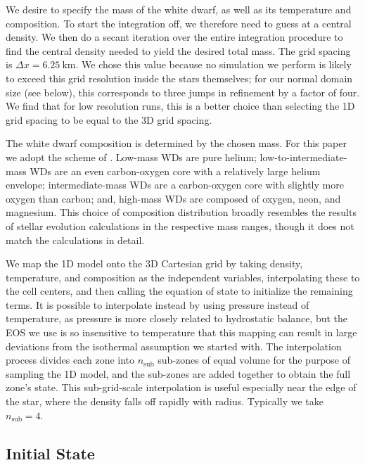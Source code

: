 \documentclass[iop]{../emulateapj}
\begin{document}
We desire to specify the mass of the white dwarf, as well as its
temperature and composition. To start the integration off, we
therefore need to guess at a central density.  We then do a secant
iteration over the entire integration procedure to find the central
density needed to yield the desired total mass.  The grid spacing is
$\Delta x = 6.25\ \text{km}$. We chose this value because no simulation
we perform is likely to exceed this grid resolution inside the stars 
themselves; for our normal domain size (see below), this corresponds to 
three jumps in refinement by a factor of four. We find that for low 
resolution runs, this is a better choice than selecting the 1D grid 
spacing to be equal to the 3D grid spacing.

The white dwarf composition is determined by the chosen mass. For 
this paper we adopt the scheme of \cite{dan:2012}. Low-mass WDs 
are pure helium; low-to-intermediate-mass WDs are an even carbon-oxygen 
core with a relatively large helium envelope; intermediate-mass 
WDs are a carbon-oxygen core with slightly more oxygen than carbon; 
and, high-mass WDs are composed of oxygen, neon, and magnesium. 
This choice of composition distribution broadly resembles the 
results of stellar evolution calculations in the respective 
mass ranges, though it does not match the calculations in detail.

We map the 1D model onto the 3D Cartesian grid by taking density,
temperature, and composition as the independent variables,
interpolating these to the cell centers, and then calling the equation
of state to initialize the remaining terms. It is possible to interpolate
instead by using pressure instead of temperature, as pressure is more 
closely related to hydrostatic balance, but the EOS we use is so 
insensitive to temperature that this mapping can result in large 
deviations from the isothermal assumption we started with.  The 
interpolation process divides each zone into $n_{\text{sub}}$ 
sub-zones of equal volume for
the purpose of sampling the 1D model, and the sub-zones are added
together to obtain the full zone's state. This
sub-grid-scale interpolation is useful especially near the edge of the star,
where the density falls off rapidly with radius. Typically we take 
$n_{\text{sub}} = 4$.

\subsection{Initial State}
\label{sec:initial_state}
\end{document}
